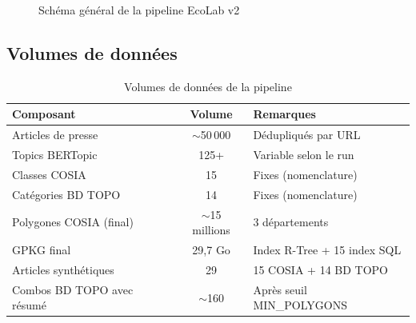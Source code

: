 \documentclass[11pt,a4paper]{report}
\newcommand{\bdtopo}{\textsc{BD TOPO}}
\begin{document}
\begin{figure}[H]
{%
}
\caption{Schéma général de la pipeline EcoLab v2}
\end{figure}

\subsection{Volumes de données}

\begin{table}[H]
\centering
\begin{tabular}{lcl}
\toprule
\rowcolor{seuilgris!75}
\textbf{Composant} & \textbf{Volume} & \textbf{Remarques} \\
\midrule
Articles de presse & $\sim$50\,000 & Dédupliqués par URL \\
Topics BERTopic & 125+ & Variable selon le run \\
Classes COSIA & 15 & Fixes (nomenclature) \\
Catégories \bdtopo{} & 14 & Fixes (nomenclature) \\
Polygones COSIA (final) & $\sim$15 millions & 3 départements \\
GPKG final & 29,7 Go & Index R-Tree + 15 index SQL \\
Articles synthétiques & 29 & 15 COSIA + 14 \bdtopo{} \\
Combos \bdtopo{} avec résumé & $\sim$160 & Après seuil MIN\_POLYGONS \\
\bottomrule
\end{tabular}
\caption{Volumes de données de la pipeline}
\end{table}
\end{document}

